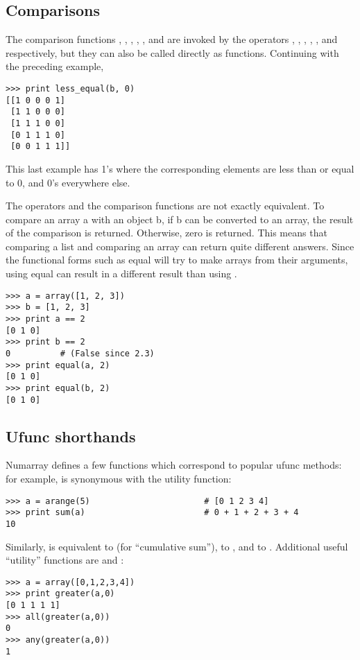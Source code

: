 \subsection{Comparisons}
\label{sec:comparisons}

The comparison functions , ,
, , , and
 are invoked by the operators \code{==}, \code{!=},
\code{>}, \code{>=}, \code{<}, and \code{<=} respectively, but they can also be
called directly as functions. Continuing with the preceding example,
\begin{verbatim}
>>> print less_equal(b, 0)
[[1 0 0 0 1]
 [1 1 0 0 0]
 [1 1 1 0 0]
 [0 1 1 1 0]
 [0 0 1 1 1]]
\end{verbatim}
This last example has 1's where the corresponding elements are less than or
equal to 0, and 0's everywhere else.

The operators and the comparison functions are not exactly equivalent.  To
compare an array a with an object b, if b can be converted to an array, the
result of the comparison is returned. Otherwise, zero is returned. This means
that comparing a list and comparing an array can return quite different
answers. Since the functional forms such as equal will try to make arrays from
their arguments, using equal can result in a different result than using
\code{==}.
\begin{verbatim}
>>> a = array([1, 2, 3])
>>> b = [1, 2, 3]
>>> print a == 2
[0 1 0]
>>> print b == 2  
0          # (False since 2.3)
>>> print equal(a, 2)
[0 1 0]
>>> print equal(b, 2)
[0 1 0]
\end{verbatim}

\subsection{Ufunc shorthands}
\label{sec:ufunc-shorthands}

Numarray defines a few functions which correspond to popular ufunc methods:
for example,  is synonymous with the 
utility function:
\begin{verbatim}
>>> a = arange(5)                       # [0 1 2 3 4]
>>> print sum(a)                        # 0 + 1 + 2 + 3 + 4
10
\end{verbatim}
Similarly,  is equivalent to  (for
``cumulative sum''),  to , and
 to .  Additional useful
``utility'' functions are  and :
\begin{verbatim}
>>> a = array([0,1,2,3,4])
>>> print greater(a,0)
[0 1 1 1 1]
>>> all(greater(a,0))
0
>>> any(greater(a,0))
1
\end{verbatim}


